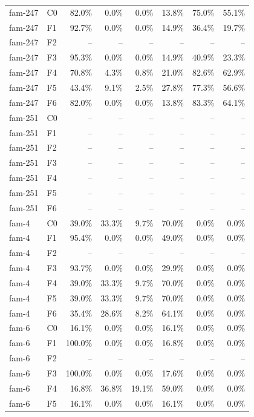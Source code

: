 \begin{tabular}{llrrrrrr}
fam-247 & C0 & 82.0\% & 0.0\% & 0.0\% & 13.8\% & 75.0\% & 55.1\% \\
fam-247 & F1 & 92.7\% & 0.0\% & 0.0\% & 14.9\% & 36.4\% & 19.7\% \\
fam-247 & F2 & -- & -- & -- & -- & -- & -- \\
fam-247 & F3 & 95.3\% & 0.0\% & 0.0\% & 14.9\% & 40.9\% & 23.3\% \\
fam-247 & F4 & 70.8\% & 4.3\% & 0.8\% & 21.0\% & 82.6\% & 62.9\% \\
fam-247 & F5 & 43.4\% & 9.1\% & 2.5\% & 27.8\% & 77.3\% & 56.6\% \\
fam-247 & F6 & 82.0\% & 0.0\% & 0.0\% & 13.8\% & 83.3\% & 64.1\% \\
fam-251 & C0 & -- & -- & -- & -- & -- & -- \\
fam-251 & F1 & -- & -- & -- & -- & -- & -- \\
fam-251 & F2 & -- & -- & -- & -- & -- & -- \\
fam-251 & F3 & -- & -- & -- & -- & -- & -- \\
fam-251 & F4 & -- & -- & -- & -- & -- & -- \\
fam-251 & F5 & -- & -- & -- & -- & -- & -- \\
fam-251 & F6 & -- & -- & -- & -- & -- & -- \\
fam-4 & C0 & 39.0\% & 33.3\% & 9.7\% & 70.0\% & 0.0\% & 0.0\% \\
fam-4 & F1 & 95.4\% & 0.0\% & 0.0\% & 49.0\% & 0.0\% & 0.0\% \\
fam-4 & F2 & -- & -- & -- & -- & -- & -- \\
fam-4 & F3 & 93.7\% & 0.0\% & 0.0\% & 29.9\% & 0.0\% & 0.0\% \\
fam-4 & F4 & 39.0\% & 33.3\% & 9.7\% & 70.0\% & 0.0\% & 0.0\% \\
fam-4 & F5 & 39.0\% & 33.3\% & 9.7\% & 70.0\% & 0.0\% & 0.0\% \\
fam-4 & F6 & 35.4\% & 28.6\% & 8.2\% & 64.1\% & 0.0\% & 0.0\% \\
fam-6 & C0 & 16.1\% & 0.0\% & 0.0\% & 16.1\% & 0.0\% & 0.0\% \\
fam-6 & F1 & 100.0\% & 0.0\% & 0.0\% & 16.8\% & 0.0\% & 0.0\% \\
fam-6 & F2 & -- & -- & -- & -- & -- & -- \\
fam-6 & F3 & 100.0\% & 0.0\% & 0.0\% & 17.6\% & 0.0\% & 0.0\% \\
fam-6 & F4 & 16.8\% & 36.8\% & 19.1\% & 59.0\% & 0.0\% & 0.0\% \\
fam-6 & F5 & 16.1\% & 0.0\% & 0.0\% & 16.1\% & 0.0\% & 0.0\% \\

\end{tabular}
